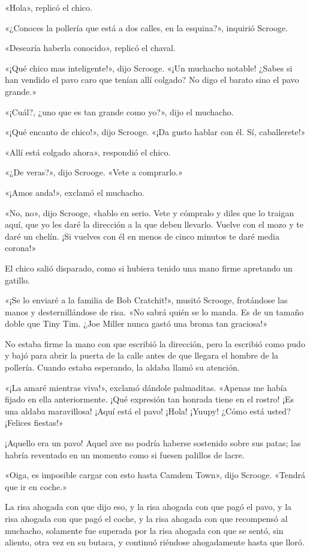 \documentclass{novela}
\begin{document}
 «Hola», replicó el chico.

 «¿Conoces la pollería que está a dos calles, en la esquina?», inquirió Scrooge.

 «Desearía haberla conocido», replicó el chaval.

 «¡Qué chico mas inteligente!», dijo Scrooge. «¡Un muchacho notable! ¿Sabes si han vendido el pavo caro que tenían allí colgado? No digo el barato sino el pavo grande.»

 «¡Cuál?, ¿uno que es tan grande como yo?», dijo el muchacho.

 «¡Qué encanto de chico!», dijo Scrooge. «¡Da gusto hablar con él. Sí, caballerete!»

 «Allí está colgado ahora», respondió el chico.

 «¿De veras?», dijo Scrooge. «Vete a comprarlo.»

 «¡Amos anda!», exclamó el muchacho.

 «No, no», dijo Scrooge, «hablo en serio. Vete y cómpralo y diles que lo traigan aquí, que yo les daré la dirección a la que deben llevarlo. Vuelve con el mozo y te daré un chelín. ¡Si vuelves con él en menos de cinco minutos te daré media corona!»

 El chico salió disparado, como si hubiera tenido una mano firme apretando un gatillo.

 «¡Se lo enviaré a la familia de Bob Cratchit!», musitó Scrooge, frotándose las manos y desternillándose de risa. «No sabrá quién se lo manda. Es de un tamaño doble que Tiny Tim. ¿Joe Miller nunca gastó una broma tan graciosa!»

 No estaba firme la mano con que escribió la dirección, pero la escribió como pudo y bajó para abrir la puerta de la calle antes de que llegara el hombre de la pollería. Cuando estaba esperando, la aldaba llamó su atención.

 «¡La amaré mientras viva!», exclamó dándole palmaditas. «Apenas me había fijado en ella anteriormente. ¡Qué expresión tan honrada tiene en el rostro! ¡Es una aldaba maravillosa! ¡Aquí está el pavo! ¡Hola! ¡Yuupy! ¿Cómo está usted? ¡Felices fiestas!»

 ¡Aquello era un pavo! Aquel ave no podría haberse sostenido sobre sus patas; las habría reventado en un momento como si fuesen palillos de lacre.

 «Oiga, es imposible cargar con esto hasta Camdem Town», dijo Scrooge. «Tendrá que ir en coche.»

 La risa ahogada con que dijo eso, y la risa ahogada con que pagó el pavo, y la risa ahogada con que pagó el coche, y la risa ahogada con que recompensó al muchacho, solamente fue superada por la risa ahogada con que se sentó, sin aliento, otra vez en su butaca, y continuó riéndose ahogadamente hasta que lloró.
\end{document}
